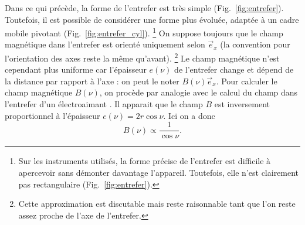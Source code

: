 \documentclass[12pt,a4paper,fleqn]{article}
\newcommand{\ex}{\vec{e}_x}
\begin{document}
Dans ce qui précède, la forme de l'entrefer est très simple (Fig.~\ref{fig:entrefer}).
Toutefois, il est possible de considérer une forme plus évoluée, adaptée à un cadre mobile pivotant (Fig.~\ref{fig:entrefer_cyl}).
\footnote{Sur les instruments utilisés, la forme précise de l'entrefer est difficile à apercevoir sans démonter davantage l'appareil.
Toutefois, elle n'est clairement pas rectangulaire (Fig.~\ref{fig:entrefer}).}
On suppose toujours que le champ magnétique dans l'entrefer est orienté uniquement selon $\ex$ (la convention pour l'orientation des axes reste la même qu'avant).
\footnote{Cette approximation est discutable mais reste raisonnable tant que l'on reste assez proche de l'axe de l'entrefer.}
Le champ magnétique n'est cependant plus uniforme car l'épaisseur $e(\nu)$ de l'entrefer change et dépend de la distance par rapport à l'axe : on peut le noter $B(\nu)\ex$.
Pour calculer le champ magnétique $B(\nu)$, on procède par analogie avec le calcul du champ dans l'entrefer d'un électroaimant \cite{Faroux1998}.
Il apparait que le champ $B$ est inversement proportionnel à l'épaisseur $e(\nu)=2r\cos\nu$.
Ici on a donc
\begin{equation}
B(\nu) \propto \frac{1}{\cos\nu}.
\end{equation}
\end{document}
